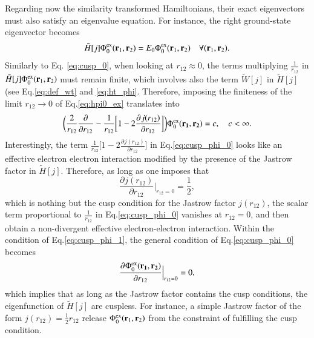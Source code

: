 \documentclass[aip,jcp,reprint,noshowkeys,superscriptaddress]{revtex4-1}
\newcommand{\deriv}[3]{\frac{\partial^{#3} #1}{\partial {#2}^{#3}}}
\newcommand{\bd}[1]{{\bf {#1}}}
\newcommand{\br}[0]{{\bf {r}}}
\newcommand{\phiex}[0]{\Phi^{\text{ex}}_0}
\begin{document}
Regarding now the similarity transformed Hamiltonians, their exact eigenvectors must also satisfy an eigenvalue equation. For instance, the right ground-state eigenvector becomes  
\begin{equation}
 \label{eq:hpi0_ex}
 \tilde{H}[j] \phiex(\br{}_1,\br{}_2) = E_0 \phiex(\br{}_1,\br{}_2) \quad \forall (\br{}_1,\br{}_2).
\end{equation}
Similarly to Eq. \eqref{eq:cusp_0}, when looking at $r_{12}\approx 0$, the terms multiplying $\frac{1}{r_{12}}$ in $\tilde{H}[j]\phiex(\br{}_1,\br{}_2)$ must remain finite, 
which involves also the term $\tilde{W}[j]$ in $\tilde{H}[j]$ (see Eq.\eqref{eq:def_wt} and \eqref{eq:ht_phi}. Therefore, imposing the finiteness of the limit $r_{12}\rightarrow 0$ of Eq.\eqref{eq:hpi0_ex} translates into
\begin{equation}
 \label{eq:cusp_phi_0}
 \bigg( \frac{2}{r_{12}} \deriv{}{r_{12}}{} -\frac{1}{r_{12}}\bigg[ 1 - 2 \deriv{j(r_{12})}{r_{12}}{}\bigg]\bigg) \phiex(\bd{r_1},\bd{r_2})  = c,\quad c<\infty.
\end{equation}
Interestingly, the term $\frac{1}{r_{12}}\bigg[ 1 - 2\deriv{j(r_{12})}{r_{12}}{}\bigg]$ in Eq.\eqref{eq:cusp_phi_0} looks like an effective electron electron interaction modified by the presence of the Jastrow factor in $\tilde{H}[j]$. 
Therefore, as long as one imposes that 
\begin{equation}
 \label{eq:cusp_phi_1}
  \deriv{j(r_{12})}{r_{12}}{}\bigg|_{r_{12}=0} = \frac{1}{2},
\end{equation}
which is nothing but the cusp condition for the Jastrow factor $j(r_{12})$, the scalar term proportional to $\frac{1}{r_{12}}$ in Eq.\eqref{eq:cusp_phi_0} vanishes at $r_{12}=0$, and then obtain a non-divergent effective electron-electron interaction. 
Within the condition of Eq.\eqref{eq:cusp_phi_1}, the general condition of Eq.\eqref{eq:cusp_phi_0} becomes 
\begin{equation}
 \label{eq:cusp_phi_2}
 \deriv{\phiex(\bd{r_1},\bd{r_2})}{r_{12}}{}\Bigr|_{r_{12}=0} = 0, 
\end{equation}
which implies that as long as the Jastrow factor contains the cusp conditions, the eigenfunction of $\tilde{H}[j]$ are cuspless. 
For instance, a simple Jastrow factor of the form $j(r_{12}) = \frac{1}{2} r_{12}$ release $\phiex(\br{}_1,\br{}_2)$ from 
the constraint of fulfilling the cusp condition. 
\end{document}
